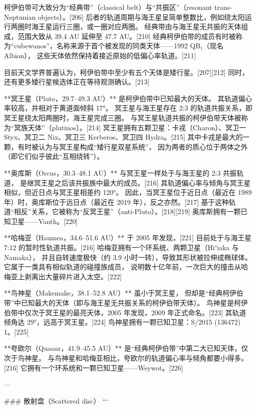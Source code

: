 柯伊伯带可大致分为“经典带”（classical belt）与“共振区”（resonant trans-Neptunian objects）。[206]  
后者的轨道周期与海王星呈简单整数比，例如绕太阳运行两圈时海王星运行三圈，或一圈对应两圈。  
经典带由与海王星无共振的天体组成，范围大致从 39.4 AU 延伸至 47.7 AU。[210]  
经典柯伊伯带的成员有时被称为“cubewanos”，名称来源于首个被发现的同类天体——1992 QB₁（现名 Albion），  
这些天体依然保持着接近原始的低偏心率轨道。[211]

目前天文学界普遍认为，柯伊伯带中至少有五个天体是矮行星。[207][212]  
同时，还有更多矮行星候选体正在等待观测确认。[213]

**冥王星（Pluto，29.7–49.3 AU）** 是柯伊伯带中已知最大的天体。  
其轨道偏心率较高，并相对于黄道面倾斜 17°。  
冥王星与海王星存在 2:3 的轨道共振关系，即冥王星绕太阳两圈时，海王星完成三圈。  
与冥王星轨道共振的柯伊伯带天体被称为“冥族天体”（plutinos）。[214]  
冥王星拥有五颗卫星：卡戎（Charon）、冥卫一 Styx、冥卫二 Nix、冥卫三 Kerberos、冥卫四 Hydra。[215]  
其中卡戎是最大的一颗，有时被认为与冥王星构成“矮行星双星系统”，  
因为两者的质心位于两体之外（即它们似乎彼此“互相绕转”）。

**奥库斯（Orcus，30.3–48.1 AU）** 与冥王星一样处于与海王星的 2:3 共振轨道，  
是继冥王星之后该共振族中最大的成员。[216]  
其轨道偏心率与倾角与冥王星相似，但近日点与冥王星相差约 120°。  
因此，当冥王星位于近日点（最近在 1989 年）时，奥库斯位于远日点（最近在 2019 年），反之亦然。[217]  
基于这种轨道“相反”关系，它被称为“反冥王星”（anti-Pluto）。[218][219]  
奥库斯拥有一颗已知卫星——Vanth。[220]

**哈梅亚（Haumea，34.6–51.6 AU）** 于 2005 年发现，[221]  
目前处于与海王星 7:12 的暂时性轨道共振。[216]  
哈梅亚拥有一个环系统、两颗卫星（Hiʻiaka 与 Namaka），  
并且自转速度极快（约 3.9 小时一转），导致其形状被拉伸成椭球体。  
它属于一类具有相似轨道的碰撞族成员，  
说明数十亿年前，一次巨大的撞击从哈梅亚上剥离出大量碎片进入太空。[222]

**鸟神星（Makemake，38.1–52.8 AU）** 虽小于冥王星，  
但却是“经典柯伊伯带”中已知最大的天体（即与海王星无共振关系的柯伊伯带天体）。  
鸟神星是柯伊伯带中仅次于冥王星的最亮天体，2005 年发现，2009 年正式命名。[223]  
其轨道倾角达 29°，远高于冥王星。[224]  
鸟神星拥有一颗已知卫星：S/2015 (136472) 1。[225]

**夸欧尔（Quaoar，41.9–45.5 AU）** 是“经典柯伊伯带”中第二大已知天体，仅次于鸟神星。  
与鸟神星和哈梅亚相比，夸欧尔的轨道偏心率与倾角都要小得多。[216]  
它拥有一个环系统和一颗已知卫星——Weywot。[226]

---

### 散射盘（Scattered disc）
```

